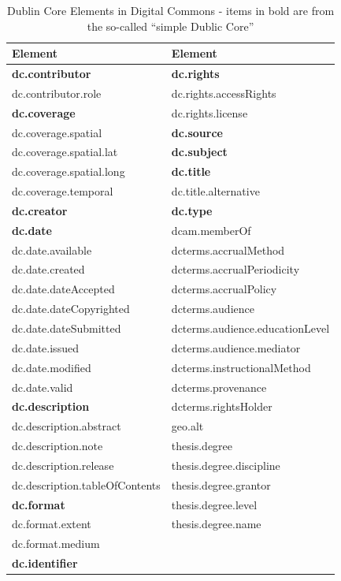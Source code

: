 \begin{table}[!ht]
    \caption{Dublin Core Elements in Digital Commons\cite{digital_commons_metadata_2016} - items in bold are from the so-called ``simple Dublic Core''}
    \label{tab:dublicCoreDigitalCommons}
    \begin{footnotesize}   
    \begin{tabular}{l | l }
      \textbf{Element} & \textbf{Element} \\
      \hline
\textbf{dc.contributor} & \textbf{dc.rights}\\
dc.contributor.role & dc.rights.accessRights\\
\textbf{dc.coverage} & dc.rights.license\\
dc.coverage.spatial & \textbf{dc.source}\\
dc.coverage.spatial.lat & \textbf{dc.subject}\\
dc.coverage.spatial.long & \textbf{dc.title}\\
dc.coverage.temporal & dc.title.alternative\\
\textbf{dc.creator} & \textbf{dc.type}\\
\textbf{dc.date} & dcam.memberOf\\
dc.date.available & dcterms.accrualMethod\\
dc.date.created & dcterms.accrualPeriodicity\\
dc.date.dateAccepted & dcterms.accrualPolicy\\
dc.date.dateCopyrighted & dcterms.audience\\
dc.date.dateSubmitted & dcterms.audience.educationLevel\\
dc.date.issued & dcterms.audience.mediator\\
dc.date.modified & dcterms.instructionalMethod\\
dc.date.valid & dcterms.provenance\\
\textbf{dc.description} & dcterms.rightsHolder\\
dc.description.abstract & geo.alt\\
dc.description.note & thesis.degree\\
dc.description.release & thesis.degree.discipline\\
dc.description.tableOfContents & thesis.degree.grantor\\
\textbf{dc.format} & thesis.degree.level\\
dc.format.extent & thesis.degree.name\\
dc.format.medium\\
\textbf{dc.identifier}\\

\end{tabular}
\end{footnotesize}
\end{table}

